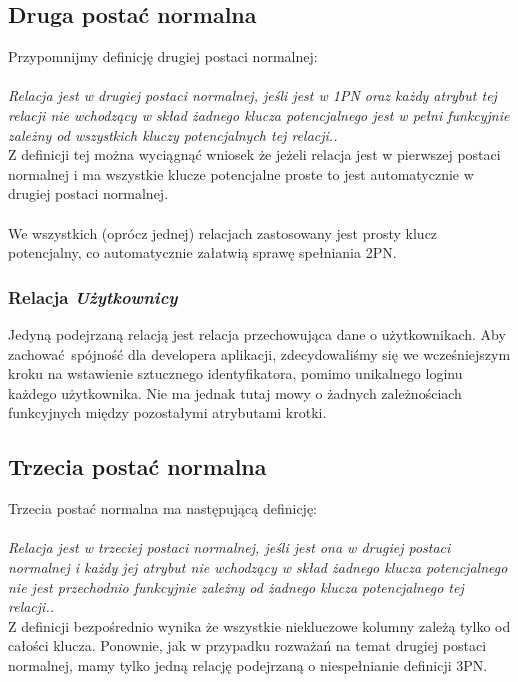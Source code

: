 \documentclass{mwrep}
\begin{document}
\subsection{Druga postać normalna}
Przypomnijmy definicję drugiej postaci normalnej: \\
\\
\emph{Relacja jest w drugiej postaci normalnej, jeśli jest w 1PN oraz każdy
atrybut tej relacji nie wchodzący w skład żadnego klucza potencjalnego
jest w pełni funkcyjnie zależny od wszystkich kluczy potencjalnych
tej relacji.\cite{Kowalczyk1}.}\\

Z definicji tej można wyciągnąć wniosek że jeżeli relacja jest w pierwszej postaci normalnej i ma wszystkie 
klucze potencjalne proste to jest automatycznie w drugiej postaci normalnej.\\
\\
We wszystkich (oprócz jednej) relacjach zastosowany jest prosty klucz potencjalny, co automatycznie załatwią sprawę spełniania 2PN.

\subsubsection{Relacja \emph{Użytkownicy}}
Jedyną podejrzaną relacją jest relacja przechowująca dane o użytkownikach. Aby zachować spójność dla developera aplikacji, zdecydowaliśmy się 
we wcześniejszym kroku na wstawienie sztucznego identyfikatora, pomimo unikalnego loginu każdego użytkownika. Nie ma jednak 
tutaj mowy o żadnych zależnościach funkcyjnych między pozostałymi atrybutami krotki.

\subsection{Trzecia postać normalna}
Trzecia postać normalna ma następującą definicję:\\
\\
\emph{Relacja jest w trzeciej postaci normalnej, jeśli jest ona w drugiej
postaci normalnej i każdy jej atrybut nie wchodzący w skład żadnego
klucza potencjalnego nie jest przechodnio funkcyjnie zależny
od żadnego klucza potencjalnego tej relacji.\cite{Kowalczyk1}.}\\

Z definicji bezpośrednio wynika że wszystkie niekluczowe kolumny zależą tylko od całości klucza. Ponownie, jak w przypadku rozważań 
na temat drugiej postaci normalnej, mamy tylko jedną relację podejrzaną o niespełnianie definicji 3PN.
\end{document}
